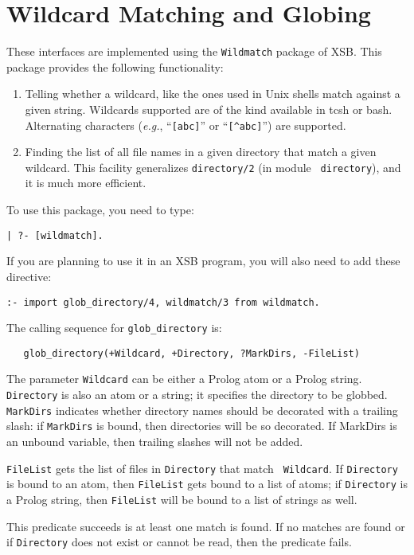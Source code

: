 \section{Wildcard Matching and Globing}

These interfaces are implemented using the {\tt Wildmatch} package of XSB.
This package provides the following functionality: 
\begin{enumerate}
\item Telling whether a wildcard, like the ones used in Unix shells match
  against a given string. Wildcards supported are of the kind available in
  tcsh or bash. Alternating characters ({\it e.g.}, ``\verb|[abc]|'' or
  ``\verb|[^abc]|'') are supported.
\item Finding the list of all file names in a given directory that match a
  given wildcard. This facility generalizes {\tt directory/2} (in module {\tt
    directory}), and it is much more efficient.
\end{enumerate}

To use this package, you need to type:
\begin{verbatim}
| ?- [wildmatch].  
\end{verbatim}
If you are planning to use it in an XSB program, you will also need to add
these directive:
\begin{verbatim}
:- import glob_directory/4, wildmatch/3 from wildmatch.
\end{verbatim}

The calling sequence for \verb|glob_directory| is:
\begin{verbatim}
   glob_directory(+Wildcard, +Directory, ?MarkDirs, -FileList)  
\end{verbatim}
The parameter {\tt Wildcard} can be either a Prolog atom or a Prolog
string. {\tt Directory} is also an atom or a string; it specifies the
directory to be globbed. {\tt MarkDirs} indicates whether directory names
should be decorated with a trailing slash: if {\tt MarkDirs} is bound, then
directories will be so decorated. If MarkDirs is an unbound variable, then
trailing slashes will not be added.

{\tt FileList} gets the list of files in {\tt Directory} that match {\tt
  Wildcard}.  If {\tt Directory} is bound to an atom, then {\tt FileList}
gets bound to a list of atoms; if {\tt Directory} is a Prolog string, then
{\tt FileList} will be bound to a list of strings as well.

This predicate succeeds is at least one match is found. If no matches are
found or if {\tt Directory} does not exist or cannot be read, then the
predicate fails.

